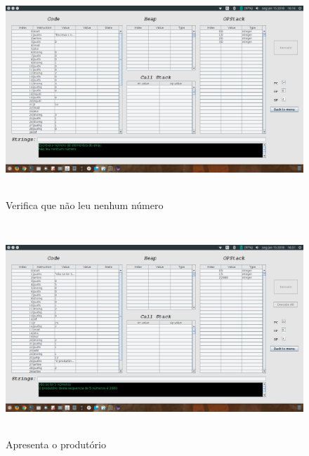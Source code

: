 \documentclass{report}
\begin{document}
\begin{figure}[h]
	\centering
	\includegraphics[width=14cm,height= 8cm]{exemplo2-2.png}
	\caption{Verifica que não leu nenhum número}
	\label{Exemplo 2.2}
\end{figure}

\begin{figure}[h]
	\centering
	\includegraphics[width=14cm,height= 8cm]{exemplo3-1.png}
	\caption{Apresenta o produtório}
	\label{Exemplo 3.1}
\end{figure}
\end{document}
